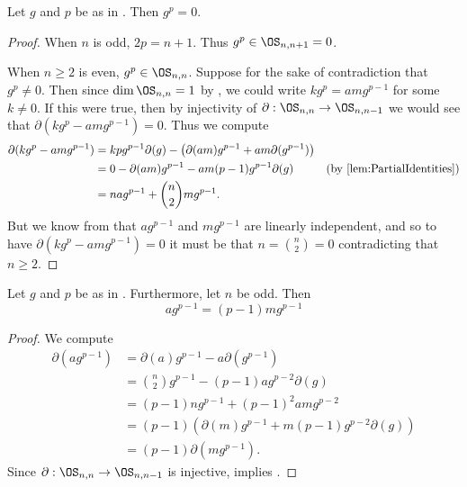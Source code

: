 \documentclass{amsart}
\begin{document}
\begin{lemma} \label{lemma:PowerofgIs0}
    Let $g$ and $p$ be as in . Then $g^p = 0$.
\end{lemma}

\begin{proof}
    When $n$ is odd, $2p = n+1$. Thus $g^p \in \OS_{n,n+1}=0$.

    When $n \geq 2$ is even, $g^p \in \OS_{n,n}$. Suppose for the sake of contradiction that $g^p \neq 0$.
    Then since $\dim \OS_{n,n} = 1$ by , we could write $kg^p = amg^{p-1}$ for some $k \neq 0$.
    If this were true, then by injectivity of $\partial: \OS_{n,n}\to\OS_{n,n-1}$ we would see that
    $\partial(kg^p - amg^{p-1}) = 0$.
    Thus we compute
    \begin{align*}
        \partial(kg^p - amg^{p-1})
        &= k p g^{p-1} \partial(g) - \left(\partial(am)g^{p-1} + am \partial(g^{p-1}) \right)\\
        &= 0 - \partial(am)g^{p-1} - am(p-1)g^{p-1} \partial(g)& (\text{by \Cref{lem:PartialIdentities}})\\
        &= nag^{p-1} + \binom{n}{2}mg^{p-1}. 
    \end{align*}
    But we know from  that $ag^{p-1}$ and $mg^{p-1}$ are linearly independent, and so to have $\partial(kg^p - amg^{p-1})=0$ it must be that $n = \binom{n}{2} = 0$ contradicting that $n \geq 2$.
\end{proof}

\begin{lemma} \label{lemma:LinearDependenceInTopDegree}
    Let $g$ and $p$ be as in . Furthermore, let $n$ be odd.
    Then
    \begin{equation}\label{eqn:LinearDependenceInTopDegree}
        a g^{p-1} = (p-1) m g^{p-1}
    \end{equation}
\end{lemma}

\begin{proof}
    We compute
    \begin{align}
        \partial(ag^{p-1})
        &= 
        \partial(a)g^{p-1} - a \partial(g^{p-1}) \nonumber \\
        &=
        \binom{n}{2}g^{p-1} - (p-1)ag^{p-2}\partial(g)\nonumber \\
        &=
        (p-1)ng^{p-1} + (p-1)^2amg^{p-2} \nonumber \\
        &=
        (p-1)\left( \partial(m) g^{p-1} + m (p-1) g^{p-2}\partial(g) \right)\nonumber \\
        &= (p-1)\partial(mg^{p-1}). \label{eqn:PartialIdentityPenultimateDegree}
    \end{align}
    Since $\partial: \OS_{n,n} \to \OS_{n,n-1}$ is injective,  implies .
\end{proof}
\end{document}
